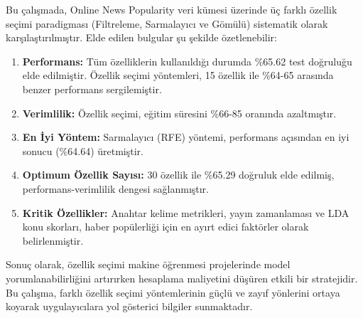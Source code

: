 \documentclass[conference]{IEEEtran}
\begin{document}
Bu çalışmada, Online News Popularity veri kümesi üzerinde üç farklı özellik seçimi paradigması (Filtreleme, Sarmalayıcı ve Gömülü) sistematik olarak karşılaştırılmıştır. Elde edilen bulgular şu şekilde özetlenebilir:

\begin{enumerate}
    \item \textbf{Performans:} Tüm özelliklerin kullanıldığı durumda \%65.62 test doğruluğu elde edilmiştir. Özellik seçimi yöntemleri, 15 özellik ile \%64-65 arasında benzer performans sergilemiştir.
    
    \item \textbf{Verimlilik:} Özellik seçimi, eğitim süresini \%66-85 oranında azaltmıştır.
    
    \item \textbf{En İyi Yöntem:} Sarmalayıcı (RFE) yöntemi, performans açısından en iyi sonucu (\%64.64) üretmiştir.
    
    \item \textbf{Optimum Özellik Sayısı:} 30 özellik ile \%65.29 doğruluk elde edilmiş, performans-verimlilik dengesi sağlanmıştır.
    
    \item \textbf{Kritik Özellikler:} Anahtar kelime metrikleri, yayın zamanlaması ve LDA konu skorları, haber popülerliği için en ayırt edici faktörler olarak belirlenmiştir.
\end{enumerate}

Sonuç olarak, özellik seçimi makine öğrenmesi projelerinde model yorumlanabilirliğini artırırken hesaplama maliyetini düşüren etkili bir stratejidir. Bu çalışma, farklı özellik seçimi yöntemlerinin güçlü ve zayıf yönlerini ortaya koyarak uygulayıcılara yol gösterici bilgiler sunmaktadır.
\end{document}
